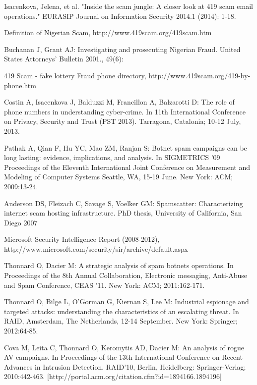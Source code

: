 \documentclass[a4paper]{article}
\begin{document}
\begin{thebibliography}{9}

 Isacenkova, Jelena, et al. "Inside the scam jungle: A closer look at 419 scam email operations." EURASIP Journal on Information Security 2014.1 (2014): 1-18.

 Definition of Nigerian Scam, http://www.419scam.org/419scam.htm

 Buchanan J, Grant AJ: Investigating and prosecuting Nigerian Fraud. United States Attorneys’ Bulletin 2001., 49(6):

 419 Scam - fake lottery Fraud phone directory, http://www.419scam.org/419-by-phone.htm

 Costin A, Isacenkova J, Balduzzi M, Francillon A, Balzarotti D: The role of phone numbers in understanding cyber-crime. In 11th International Conference on Privacy, Security and Trust (PST 2013). Tarragona, Catalonia; 10-12 July, 2013.

 Pathak A, Qian F, Hu YC, Mao ZM, Ranjan S: Botnet spam campaigns can be long lasting: evidence, implications, and analysis. In SIGMETRICS ’09 Proceedings of the Eleventh International Joint Conference on Measurement and Modeling of Computer Systems Seattle, WA, 15-19 June. New York: ACM; 2009:13-24.

 Anderson DS, Fleizach C, Savage S, Voelker GM: Spamscatter: Characterizing internet scam hosting infrastructure. PhD thesis, University of California, San Diego 2007

 Microsoft Security Intelligence Report (2008-2012), http://www.microsoft.com/security/sir/archive/default.aspx

 Thonnard O, Dacier M: A strategic analysis of spam botnets operations. In Proceedings of the 8th Annual Collaboration, Electronic messaging, Anti-Abuse and Spam Conference, CEAS ’11. New York: ACM; 2011:162-171.

 Thonnard O, Bilge L, O’Gorman G, Kiernan S, Lee M: Industrial espionage and targeted attacks: understanding the characteristics of an escalating threat. In RAID, Amsterdam, The Netherlands, 12-14 September. New York: Springer; 2012:64-85.

 Cova M, Leita C, Thonnard O, Keromytis AD, Dacier M: An analysis of rogue AV campaigns. In Proceedings of the 13th International Conference on Recent Advances in Intrusion Detection. RAID’10, Berlin, Heidelberg: Springer-Verlag; 2010:442-463. [http://portal.acm.org/citation.cfm?id=1894166.1894196]


\end{thebibliography}
\end{document}
